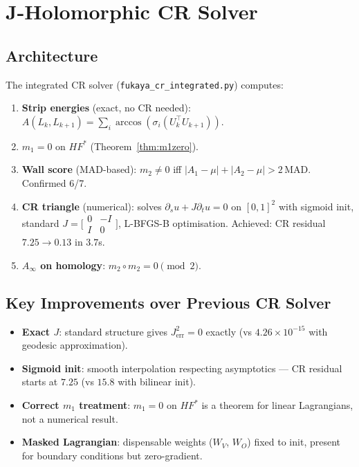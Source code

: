 \documentclass[11pt]{amsart}
\begin{document}
\section{J-Holomorphic CR Solver}
\label{sec:cr}

\subsection{Architecture}

The integrated CR solver (\texttt{fukaya\_cr\_integrated.py}) computes:
\begin{enumerate}
\item \textbf{Strip energies} (exact, no CR needed):
  $A(L_k,L_{k+1}) = \sum_i \arccos(\sigma_i(U_k^\top U_{k+1}))$.
\item \textbf{$m_1 = 0$} on $HF^{*}$ (Theorem~\ref{thm:m1zero}).
\item \textbf{Wall score} (MAD-based): $m_2\neq 0$ iff
  $|A_1-\mu|+|A_2-\mu|>2\,\mathrm{MAD}$. Confirmed 6/7.
\item \textbf{CR triangle} (numerical): solves
  $\partial_s u + J\partial_t u=0$ on $[0,1]^2$ with sigmoid init,
  standard $J=\bigl[\begin{smallmatrix}0&-I\\I&0\end{smallmatrix}\bigr]$,
  L-BFGS-B optimisation.
  Achieved: CR residual $7.25\to 0.13$ in $3.7$s.
\item \textbf{$A_\infty$ on homology}: $m_2\circ m_2=0\pmod{2}$.
\end{enumerate}

\subsection{Key Improvements over Previous CR Solver}

\begin{itemize}
\item \textbf{Exact $J$}: standard structure gives $J^2_\mathrm{err}=0$
  exactly (vs $4.26\times 10^{-15}$ with geodesic approximation).
\item \textbf{Sigmoid init}: smooth interpolation respecting asymptotics
  --- CR residual starts at $7.25$ (vs $15.8$ with bilinear init).
\item \textbf{Correct $m_1$ treatment}: $m_1=0$ on $HF^{*}$ is a theorem
  for linear Lagrangians, not a numerical result.
\item \textbf{Masked Lagrangian}: dispensable weights ($W_V$, $W_O$)
  fixed to init, present for boundary conditions but zero-gradient.
\end{itemize}
\end{document}
